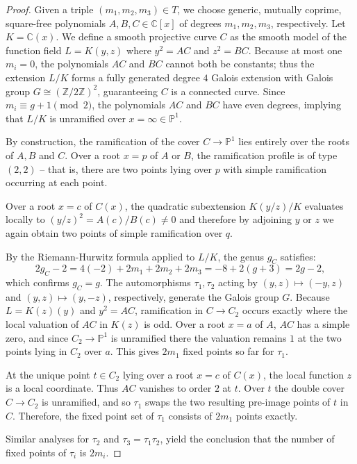 \documentclass[reqno]{amsart}
\theoremstyle{plain}
\renewcommand{\P}{\mathbb{P}}
\newcommand{\Z}{\mathbb{Z}}
\newcommand{\C}{\mathbb{C}}
\begin{document}
\begin{proof}
  Given a triple $(m_1,m_2,m_3) \in T$, we choose generic, mutually coprime,
  square-free polynomials $A,B,C \in \C[x]$ of degrees $m_1, m_2, m_3$,
  respectively. Let $K = \C(x)$.  We define a smooth projective curve $C$ as the
  smooth model of the function field $L = K(y,z)$ where $y^{2} = AC$ and $z^{2}
  = BC$.  Because at most one $m_i = 0$, the polynomials $AC$ and $BC$ cannot
  both be constants; thus the extension $L/K$ forms a fully generated degree $4$
  Galois extension with Galois group $G \cong (\Z/2\Z)^{2}$, guaranteeing $C$ is
  a connected curve.  Since $m_i \equiv g+1 \pmod 2$, the polynomials $AC$ and
  $BC$ have even degrees, implying that $L/K$ is unramified over $x = \infty \in
  \P^{1}$. 

  By construction, the ramification of the cover $C \to \P^{1}$ lies entirely
  over the roots of $A,B$ and $C$.  Over a root $x=p$ of $A$ or $B$, the ramification
  profile is of type $(2,2)$ -- that is, there are two points lying over $p$
  with simple ramification occurring at each point. 

  Over a root $x=c$ of $C(x)$, the quadratic subextension $K(y/z)/K$ evaluates locally to
  $(y/z)^{2} = A(c)/B(c) \neq 0$ and therefore by adjoining $y$ or $z$ we again
  obtain two points of simple ramification over $q$.  

  By the Riemann-Hurwitz formula applied to $L/K$, the genus $g_C$ satisfies: 
  \[2g_{C}-2 = 4(-2) + 2m_1 + 2m_2 + 2 m_3 = -8 + 2(g+3) = 2g-2,\] which
  confirms $g_{C}=g$. The automorphisms $\tau_1, \tau_2$ acting by $(y,z) \mapsto (-y,z)$
 and $(y,z) \mapsto (y,-z)$, respectively, generate the Galois group $G$. Because $L
 = K(z)(y)$ and $y^{2} = AC$, ramification in $C \to C_{2}$ occurs exactly where
 the local valuation of $AC$ in $K(z)$ is odd.  Over a root $x=a$ of $A$, $AC$ has a
 simple zero, and since $C_{2} \to \P^{1}$ is unramified there the valuation
 remains $1$ at the two points lying in $C_{2}$ over $a$.  This gives
 $2m_1$ fixed points so far for $\tau_1$.  

 At the unique point $t \in C_{2}$ lying over a root $x = c$ of $C(x)$, the local function $z$ is a local coordinate. 
 Thus $AC$ vanishes to order $2$ at $t$. Over $t$ the double cover $C \to C_2$ is unramified, and so $\tau_{1}$ swaps the two 
 resulting pre-image points of $t$ in $C$.   Therefore, the fixed point set of $\tau_1$ consists of $2m_1$ points exactly. 

 Similar analyses for $\tau_2$ and $\tau_3 = \tau_1 \tau_{2}$, yield the conclusion that the number of fixed points
 of $\tau_i$ is $2m_i$.



\end{proof}
\end{document}
